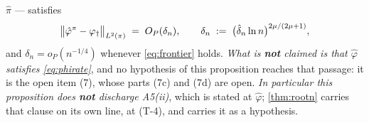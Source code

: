 \begin{proposition}
$\hat\pi$ --- satisfies
\begin{equation}\label{eq:phirate}
\big\|\hat\varphi^{\pi}-\varphi_{\dagger}\big\|_{L^{2}(\pi)}\;=\;O_P(\delta_n),
\qquad
\delta_n\;:=\;\big(\hat\delta_n\ln n\big)^{2\mu/(2\mu+1)} ,
\end{equation}
and $\delta_n=o_P(n^{-1/4})$ whenever \eqref{eq:frontier} holds.
\emph{What is \textbf{not} claimed is that $\hat\varphi$ satisfies \eqref{eq:phirate}}, and no hypothesis
of this proposition reaches that passage: it is the open item \textup{(7)},
whose parts \textup{(7c)} and \textup{(7d)} are open. \emph{In particular this proposition does
\textbf{not} discharge A5(ii)}, which is stated at $\hat\varphi$; \cref{thm:rootn} carries that clause on
its own line, at \textup{(T-4)}, and carries it as a hypothesis.

\end{proposition}
